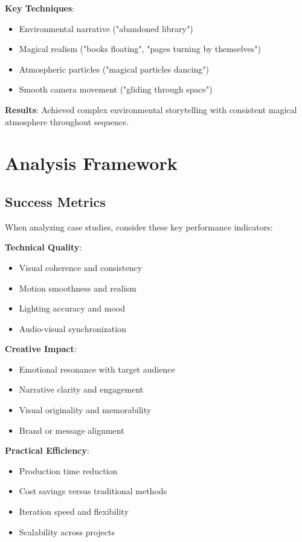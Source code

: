\textbf{Key Techniques}:
\begin{itemize}
\item Environmental narrative ("abandoned library")
\item Magical realism ("books floating", "pages turning by themselves")
\item Atmospheric particles ("magical particles dancing")
\item Smooth camera movement ("gliding through space")
\end{itemize}

\textbf{Results}: Achieved complex environmental storytelling with consistent magical atmosphere throughout sequence.

\section{Analysis Framework}

\subsection{Success Metrics}
When analyzing case studies, consider these key performance indicators:

\textbf{Technical Quality}:
\begin{itemize}
\item Visual coherence and consistency
\item Motion smoothness and realism
\item Lighting accuracy and mood
\item Audio-visual synchronization
\end{itemize}

\textbf{Creative Impact}:
\begin{itemize}
\item Emotional resonance with target audience
\item Narrative clarity and engagement
\item Visual originality and memorability
\item Brand or message alignment
\end{itemize}

\textbf{Practical Efficiency}:
\begin{itemize}
\item Production time reduction
\item Cost savings versus traditional methods
\item Iteration speed and flexibility
\item Scalability across projects
\end{itemize}

